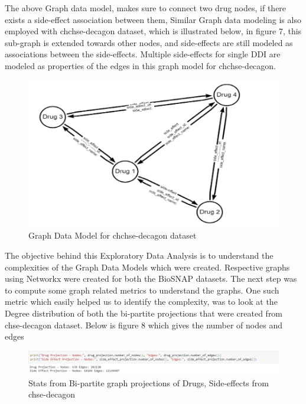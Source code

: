 \documentclass[journal,transmag]{J-NaNA}
\begin{document}
The above Graph data model, makes sure to connect two drug nodes, if there exists a side-effect association between them, Similar Graph data modeling is also employed with chchse-decagon dataset, which is illustrated below, in figure 7, this sub-graph is extended towards other nodes, and side-effects are still modeled as associations between the side-effects. Multiple side-effects for single DDI are modeled as properties of the edges in this graph model for chchse-decagon. 

\begin{figure}[htbp]
\centering
\includegraphics[width=\linewidth]{chchse-decagon-graph.PNG} 
\caption{Graph Data Model for chchse-decagon dataset}
\label{fig: chchse-decagon sample Graph Data Model} %
\end{figure}

The objective behind this Exploratory Data Analysis is to understand the complexities of the Graph Data Models which were created. Respective graphs using Networkx were created for both the BioSNAP datasets. The next step was to compute some graph related metrics to understand the graphs. One such metric which easily helped us to identify the complexity, was to look at the Degree distribution of both the bi-partite projections that were created from chse-decagon dataset. Below is figure 8 which gives the number of nodes and edges 

\begin{figure}[htbp]
\centering
\includegraphics[width=\linewidth]{bi-partite-projection-chse.PNG} 
\caption{Stats from Bi-partite graph projections of Drugs, Side-effects from chse-decagon}
\label{fig: chse-decagon bi-partite details} %
\end{figure}
\end{document}

